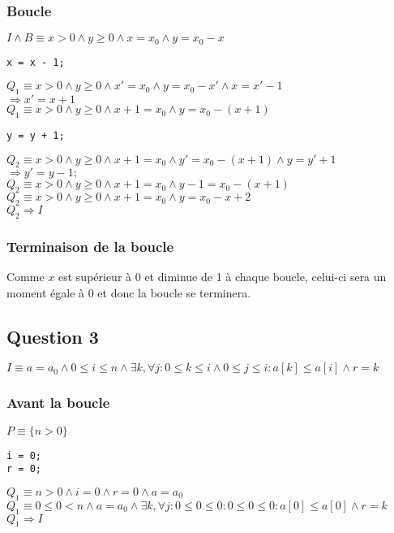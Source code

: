 \documentclass[11pt]{article}
\begin{document}
\subsubsection{Boucle}
$I \land B \equiv  x > 0 \land y \geq 0 \land x = x_0 \land y = x_0 - x$
\begin{lstlisting}[style=CStyle]
x = x - 1;
\end{lstlisting}
$Q_{1} \equiv x > 0 \land y \geq 0 \land x' = x_0 \land y = x_0 - x' \land x = x' - 1$\\
$\Rightarrow x' = x + 1$\\
$Q_{1} \equiv x > 0 \land y \geq 0 \land x + 1 = x_0 \land y = x_0 - (x + 1)$
\begin{lstlisting}[style=CStyle]
y = y + 1;
\end{lstlisting}
$Q_{2} \equiv x > 0 \land y \geq 0 \land x + 1 = x_0 \land y' = x_0 - (x + 1) \land y = y' + 1$\\
$\Rightarrow y' = y - 1;$\\
$Q_{2} \equiv x > 0 \land y \geq 0 \land x + 1 = x_0 \land y - 1 = x_0 - (x + 1)$\\
$Q_{2} \equiv x > 0 \land y \geq 0 \land x + 1 = x_0 \land y = x_0 - x + 2$\\
$Q_{2} \Rightarrow I$

\subsubsection{Terminaison de la boucle}
Comme $x$ est supérieur à 0 et diminue de 1 à chaque boucle, celui-ci sera un moment égale à 0 et donc la boucle se terminera. 

\subsection{Question 3}
$ I \equiv
	a = a_0 \land
	0 \leq i \leq n \land
	\exists k, \forall j : 0 \leq k \leq i \land 0 \leq j \leq i : a[k] \leq a[i] \land
	r = k  
$

\subsubsection{Avant la boucle}
$P \equiv \{ n > 0 \}$
\begin{lstlisting}[style=CStyle]
i = 0;
r = 0;
\end{lstlisting}
$Q_1 \equiv n > 0 \land i = 0 \land r = 0 \land a = a_0$\\
$Q_1 \equiv 0 \leq 0 < n \land a = a_0 \land \exists k, \forall j : 0 \leq 0 \leq 0 : 0 \leq 0 \leq 0 : a[0] \leq a[0] \land r = k$\\
$Q_1 \Rightarrow I$
\end{document}
